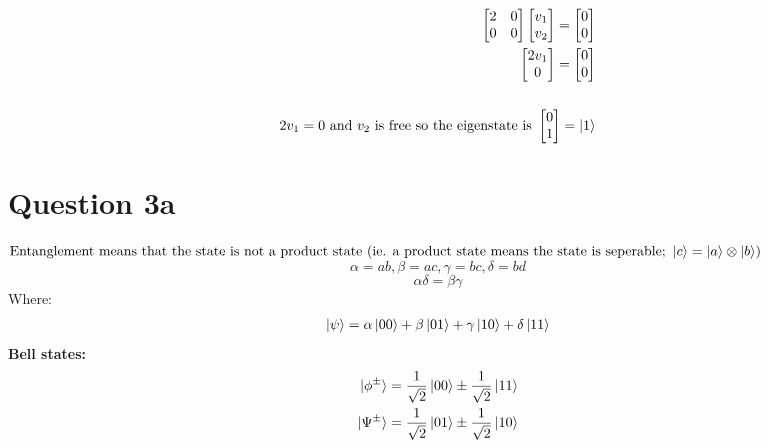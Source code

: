\documentclass{article}
\begin{document}
\begin{align*}
\begin{split}
        \begin{bmatrix}
            2 & 0 \\
            0 & 0
        \end{bmatrix} \begin{bmatrix} v_1 \\ v_2 \end{bmatrix} = \begin{bmatrix} 0 \\ 0 \end{bmatrix} \\
        \begin{bmatrix} 2v_1 \\ 0 \end{bmatrix} = \begin{bmatrix} 0 \\ 0 \end{bmatrix} \\\\
        2v_1 = 0 \text{ and } v_2 \text{ is free so the eigenstate is } \begin{bmatrix} 0 \\ 1 \end{bmatrix} = \ket{1} \\
    \end{split}
\end{align*}

\newpage

\section*{Question 3a}
$ \text{Entanglement means that the state is not a product state (ie. a product state means the state is seperable; }\ket{c} = \ket{a} \otimes \ket{b})$
\[
    \alpha = ab, \beta = ac, \gamma = bc, \delta = bd
\]
\[
    \alpha \delta = \beta \gamma
\]
Where:
\begin{align*}
    \ket{\psi} = \alpha \ket{00} + \beta \ket{01} + \gamma \ket{10} + \delta \ket{11}
\end{align*}
\textbf{Bell states:}
\begin{align*}
    \begin{split}
        \ket{\phi^\pm} &= \frac{1}{\sqrt{2}} \ket{00} \pm \frac{1}{\sqrt{2}} \ket{11} \\
        \ket{\Psi^\pm} &= \frac{1}{\sqrt{2}} \ket{01} \pm \frac{1}{\sqrt{2}} \ket{10} \\\\
    \end{split}
\end{align*}
\end{document}
